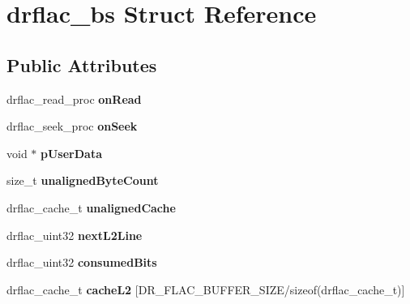 \hypertarget{structdrflac__bs}{\section{drflac\-\_\-bs Struct Reference}
\label{structdrflac__bs}
}
\subsection*{Public Attributes}
\begin{DoxyCompactItemize}
\item 
\hypertarget{structdrflac__bs_a50c7c79519b6361aeb3359e0a6976cd1}{drflac\-\_\-read\-\_\-proc {\bfseries on\-Read}}\label{structdrflac__bs_a50c7c79519b6361aeb3359e0a6976cd1}

\item 
\hypertarget{structdrflac__bs_a2b3f98bd08b0c10b4973f07490e68b4d}{drflac\-\_\-seek\-\_\-proc {\bfseries on\-Seek}}\label{structdrflac__bs_a2b3f98bd08b0c10b4973f07490e68b4d}

\item 
\hypertarget{structdrflac__bs_ab77ba4df7fa728dd3efe8f3706fcdc2e}{void $\ast$ {\bfseries p\-User\-Data}}\label{structdrflac__bs_ab77ba4df7fa728dd3efe8f3706fcdc2e}

\item 
\hypertarget{structdrflac__bs_ab934d8140dbe0361931fe3cec2794f2d}{size\-\_\-t {\bfseries unaligned\-Byte\-Count}}\label{structdrflac__bs_ab934d8140dbe0361931fe3cec2794f2d}

\item 
\hypertarget{structdrflac__bs_a8d7898d20ffc384396f24aaf8f85360f}{drflac\-\_\-cache\-\_\-t {\bfseries unaligned\-Cache}}\label{structdrflac__bs_a8d7898d20ffc384396f24aaf8f85360f}

\item 
\hypertarget{structdrflac__bs_a9814f0137b4a1643f1d92f4b730395df}{drflac\-\_\-uint32 {\bfseries next\-L2\-Line}}\label{structdrflac__bs_a9814f0137b4a1643f1d92f4b730395df}

\item 
\hypertarget{structdrflac__bs_a0bd502ee71e583220d89b54e0dbc4482}{drflac\-\_\-uint32 {\bfseries consumed\-Bits}}\label{structdrflac__bs_a0bd502ee71e583220d89b54e0dbc4482}

\item 
\hypertarget{structdrflac__bs_a47ae286de411c910b64f97f84085ceb3}{drflac\-\_\-cache\-\_\-t {\bfseries cache\-L2} \mbox{[}D\-R\-\_\-\-F\-L\-A\-C\-\_\-\-B\-U\-F\-F\-E\-R\-\_\-\-S\-I\-Z\-E/sizeof(drflac\-\_\-cache\-\_\-t)\mbox{]}}\label{structdrflac__bs_a47ae286de411c910b64f97f84085ceb3}


\end{DoxyCompactItemize}
